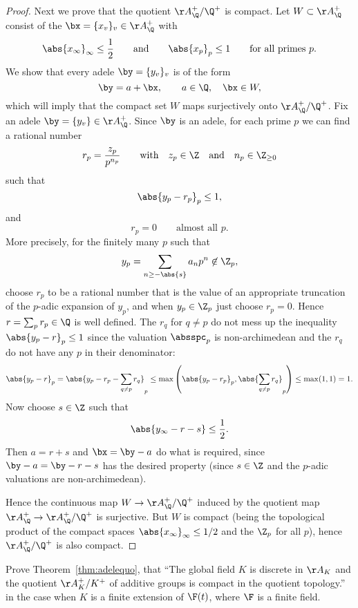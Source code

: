 \documentclass[11pt]{book}
\begin{document}
\begin{ch}
\begin{proof}
Next we prove that the quotient $\AA_\Q^+/\Q^+$ is compact.
Let $W\subset \AA_\Q^+$ consist of the $\bx=\{x_v\}_v\in \AA_\Q^+$
with
$$
  \abs{x_\infty}_\infty \leq \frac{1}{2}\qquad\text{and}\qquad
   \abs{x_p}_p \leq 1\qquad\text{for all primes $p$}.
$$
We show that every adele $\by=\{y_v\}_v$ is of the form
$$
  \by = a + \bx, \qquad a\in \Q, \quad \bx\in W,
$$
which will imply that the compact set $W$ maps surjectively
onto $\AA_\Q^+ / \Q^+$.
Fix an adele $\by=\{y_v\}\in\AA_\Q^+$.  Since $\by$
is an adele, for each prime $p$ we can find
a rational number
$$
  r_p = \frac{z_p}{p^{n_p}}
\qquad \text{with} \quad z_p \in \Z \quad \text{and} \quad n_p \in \Z_{\geq 0}
$$
such that
$$
  \abs{y_p - r_p}_p \leq 1,
$$
and
$$
  r_p = 0 \qquad \text{almost all $p$}.
$$
More precisely, for the finitely
many $p$ such that $$y_p = \sum_{n\geq -\abs{s}} a_np^n \not\in\Z_p,$$ choose
$r_p$ to be a rational number that is the value of an appropriate truncation
of the $p$-adic expansion of $y_p$, and
when $y_p\in \Z_p$ just choose $r_p = 0$.
Hence $r=\sum_{p} r_p\in\Q$ is well defined.
The $r_q$ for $q\neq p$ do not mess up the inequality
$\abs{y_p - r}_p \leq 1$ since the
valuation $\absspc_p$ is non-archimedean and the $r_q$ do not have any $p$ in
their denominator:
$$\abs{y_p  - r}_p
   = \abs{y_p - r_p - \sum_{q\neq p} r_q}_p
   \leq \max\left(\abs{y_p - r_p}_p, \abs{\sum_{q\neq p} r_q}_p\right)
   \leq \max(1,1) = 1.
$$
Now choose $s\in\Z$ such that
$$
  \abs{y_\infty - r-s} \leq \frac{1}{2}.
$$
Then $a=r+s$ and $\bx = \by - a$ do what is required,
since $\by - a = \by - r - s$ has the desired property
(since $s\in\Z$ and the $p$-adic valuations are
non-archimedean).

Hence the continuous map $W\to \AA_\Q^+/\Q^+$ induced by the quotient
map $\AA_\Q^+ \to \AA_\Q^+/\Q^+$ is surjective.  But $W$ is compact
(being the topological product of the compact spaces
$\abs{x_\infty}_\infty\leq 1/2$ and the $\Z_p$ for all $p$), hence
$\AA_\Q^+/\Q^+$ is also compact.
\end{proof}

\begin{exercise}\label{ex:adeles2}
  Prove Theorem~\ref{thm:adelequo}, that ``The global field $K$
  is discrete in $\AA_K$ and the quotient $\AA_K^+/K^+$ of additive
  groups is compact in the quotient topology.'' in the case when $K$
  is a finite extension of $\F(t)$, where $\F$ is a finite field.
\end{exercise}



\end{ch}
\end{document}
